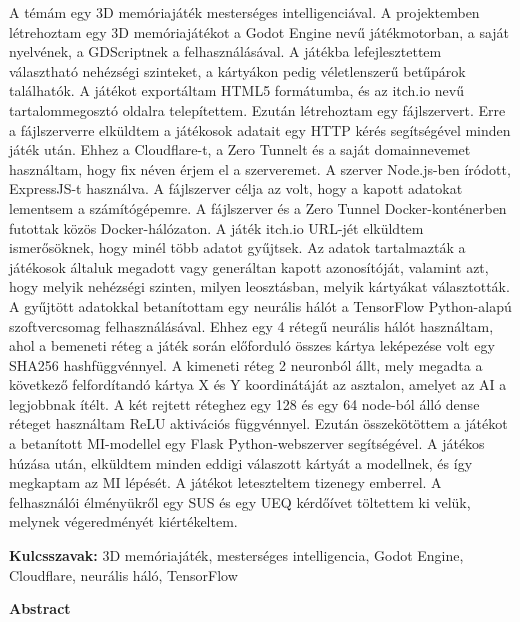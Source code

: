 A témám egy 3D memóriajáték mesterséges intelligenciával.
A projektemben létrehoztam egy 3D memóriajátékot a Godot Engine nevű játékmotorban, a saját nyelvének, a GDScriptnek a felhasználásával. A játékba lefejlesztettem választható nehézségi szinteket, a kártyákon pedig véletlenszerű betűpárok találhatók.
A játékot exportáltam HTML5 formátumba, és az itch.io nevű tartalommegosztó oldalra telepítettem.
Ezután létrehoztam egy fájlszervert. Erre a fájlszerverre elküldtem a játékosok adatait egy HTTP kérés segítségével minden játék után. Ehhez a Cloudflare-t, a Zero Tunnelt és a saját domainnevemet használtam, hogy fix néven érjem el a szerveremet.
A szerver Node.js-ben íródott, ExpressJS-t használva. A fájlszerver célja az volt, hogy a kapott adatokat lementsem a számítógépemre.
A fájlszerver és a Zero Tunnel Docker-konténerben futottak közös Docker-hálózaton.
A játék itch.io URL-jét elküldtem ismerősöknek, hogy minél több adatot gyűjtsek.
Az adatok tartalmazták a játékosok általuk megadott vagy generáltan kapott azonosítóját, valamint azt, hogy melyik nehézségi szinten, milyen leosztásban, melyik kártyákat választották.
A gyűjtött adatokkal betanítottam egy neurális hálót a TensorFlow Python-alapú szoftvercsomag felhasználásával.
Ehhez egy 4 rétegű neurális hálót használtam, ahol a bemeneti réteg a játék során előforduló összes kártya leképezése volt egy SHA256 hashfüggvénnyel.
A kimeneti réteg 2 neuronból állt, mely megadta  a következő felfordítandó kártya X és Y koordinátáját az asztalon, amelyet az AI a legjobbnak ítélt.
A két rejtett réteghez egy 128 és egy 64 node-ból álló dense réteget használtam ReLU aktivációs függvénnyel.
Ezután összekötöttem a játékot a betanított MI-modellel egy Flask Python-webszerver segítségével. A játékos húzása után, elküldtem minden eddigi válaszott kártyát a modellnek, és így megkaptam az MI lépését.
A játékot leteszteltem tizenegy emberrel. A felhasználói élményükről egy SUS és egy UEQ kérdőívet töltettem ki velük, melynek végeredményét kiértékeltem.
\vspace{8pt}



\textbf{Kulcsszavak: }3D memóriajáték, mesterséges intelligencia, Godot Engine, Cloudflare, neurális háló, TensorFlow
\newpage



\textbf{\large{Abstract}}\\[32pt]

\thispagestyle{fancy}
\pagestyle{fancy}

